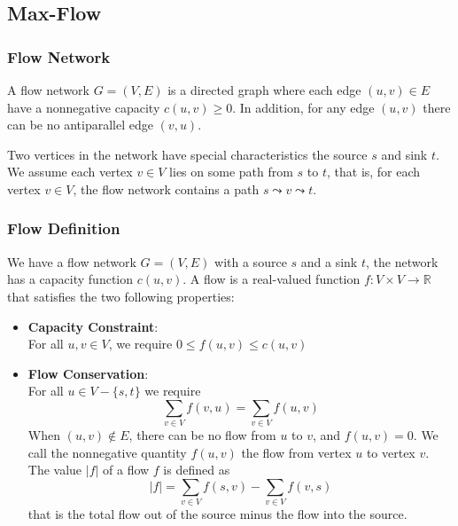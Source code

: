 \subsection{Max-Flow}
\subsubsection{Flow Network}
A flow network $G=(V,E)$ is a directed graph where each edge $(u,v) \in E$ have
a nonnegative capacity $c(u,v) \geq 0$. In addition, for any edge $(u,v)$ there
can be no antiparallel edge $(v,u)$.

Two vertices in the network have special characteristics the source $s$ and sink
$t$. We assume each vertex $v \in V$ lies on some path from $s$ to $t$, that is,
for each vertex $v \in V$, the flow network contains a path $s \leadsto v
\leadsto t$.

\subsubsection{Flow Definition}
We have a flow network $G = (V,E)$ with a source $s$ and a sink $t$, the network
has a capacity function $c(u,v)$. A flow is a real-valued function $f : V \times
V \rightarrow \mathbb{R}$ that satisfies the two following properties:
\begin{itemize}
  \item \textbf{Capacity Constraint}:\\
    For all $u,v \in V$, we require $0 \leq f(u,v) \leq c(u,v)$
  \item \textbf{Flow Conservation}:\\
    For all $u \in V - \{s,t\}$ we require
    \[
      \sum_{v\in V}f(v,u) = \sum_{v\in V}f(u,v)
    \]
    When $(u,v) \notin E$, there can be no flow from $u$ to $v$, and $f(u,v) =
    0$. We call the nonnegative quantity $f(u,v)$ the flow from vertex $u$ to
    vertex $v$. The value $|f|$ of a flow $f$ is defined as
    \[
      |f| = \sum_{v \in V} f(s,v) - \sum_{v \in V} f(v,s)
    \]
    that is the total flow out of the source minus the flow into the source.
\end{itemize}